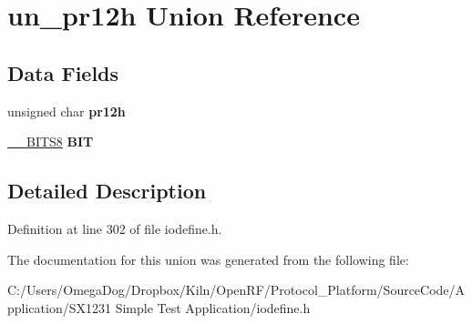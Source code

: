 \hypertarget{unionun__pr12h}{\section{un\-\_\-pr12h Union Reference}
\label{unionun__pr12h}
}
\subsection*{Data Fields}
\begin{DoxyCompactItemize}
\item 
\hypertarget{unionun__pr12h_a2c6acf6ecb1545768ea2aa6082dad738}{unsigned char {\bfseries pr12h}}\label{unionun__pr12h_a2c6acf6ecb1545768ea2aa6082dad738}

\item 
\hypertarget{unionun__pr12h_a6b86a0188aecc39a78d3f021b919db1f}{\hyperlink{struct_____b_i_t_s8}{\-\_\-\-\_\-\-B\-I\-T\-S8} {\bfseries B\-I\-T}}\label{unionun__pr12h_a6b86a0188aecc39a78d3f021b919db1f}

\end{DoxyCompactItemize}


\subsection{Detailed Description}


Definition at line 302 of file iodefine.\-h.



The documentation for this union was generated from the following file\-:\begin{DoxyCompactItemize}
\item 
C\-:/\-Users/\-Omega\-Dog/\-Dropbox/\-Kiln/\-Open\-R\-F/\-Protocol\-\_\-\-Platform/\-Source\-Code/\-Application/\-S\-X1231 Simple Test Application/iodefine.\-h\end{DoxyCompactItemize}
